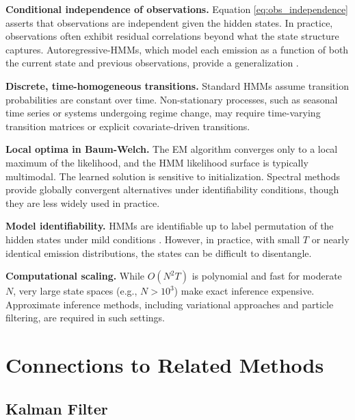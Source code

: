 \documentclass[conference]{IEEEtran}
\begin{document}
\textbf{Conditional independence of observations.} Equation \eqref{eq:obs_independence} asserts that observations are independent given the hidden states. In practice, observations often exhibit residual correlations beyond what the state structure captures. Autoregressive-HMMs, which model each emission as a function of both the current state and previous observations, provide a generalization \cite{ghahramani1996factorial}.

\textbf{Discrete, time-homogeneous transitions.} Standard HMMs assume transition probabilities are constant over time. Non-stationary processes, such as seasonal time series or systems undergoing regime change, may require time-varying transition matrices or explicit covariate-driven transitions.

\textbf{Local optima in Baum-Welch.} The EM algorithm converges only to a local maximum of the likelihood, and the HMM likelihood surface is typically multimodal. The learned solution is sensitive to initialization. Spectral methods \cite{hsu2012spectral} provide globally convergent alternatives under identifiability conditions, though they are less widely used in practice.

\textbf{Model identifiability.} HMMs are identifiable up to label permutation of the hidden states under mild conditions \cite{allman2009identifiability}. However, in practice, with small $T$ or nearly identical emission distributions, the states can be difficult to disentangle.

\textbf{Computational scaling.} While $O(N^2 T)$ is polynomial and fast for moderate $N$, very large state spaces (e.g., $N > 10^3$) make exact inference expensive. Approximate inference methods, including variational approaches and particle filtering, are required in such settings.

\section{Connections to Related Methods}
\label{sec:related}

\subsection{Kalman Filter}
\end{document}
